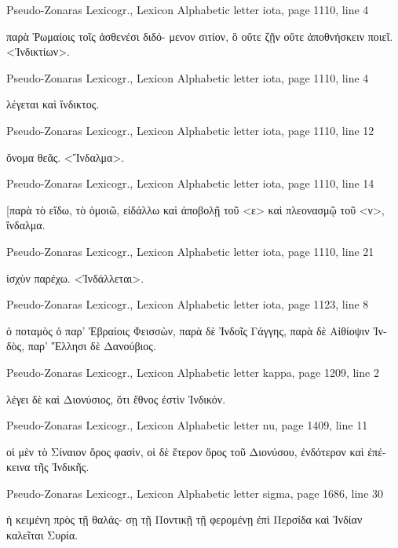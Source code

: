 \documentclass[12pt,letterpaper,twoside,final]{memoir}
\begin{document}
\begin{greek}
Pseudo-Zonaras Lexicogr., Lexicon 
Alphabetic letter iota, page 1110, line 4

                  παρὰ Ῥωμαίοις τοῖς ἀσθενέσι διδό-
 μενον σιτίον, ὃ οὔτε ζῇν οὔτε ἀποθνήσκειν ποιεῖ. 
<Ἰνδικτίων>. 



Pseudo-Zonaras Lexicogr., Lexicon 
Alphabetic letter iota, page 1110, line 4

                  λέγεται καὶ ἴνδικτος. 



Pseudo-Zonaras Lexicogr., Lexicon 
Alphabetic letter iota, page 1110, line 12

            ὄνομα θεᾶς. 
<Ἴνδαλμα>. 



Pseudo-Zonaras Lexicogr., Lexicon 
Alphabetic letter iota, page 1110, line 14

                                              [παρὰ 
 τὸ εἴδω, τὸ ὁμοιῶ, εἰδάλλω καὶ ἀποβολῇ τοῦ <ε> 
 καὶ πλεονασμῷ τοῦ <ν>, ἴνδαλμα. 



Pseudo-Zonaras Lexicogr., Lexicon 
Alphabetic letter iota, page 1110, line 21

               ἰσχὺν παρέχω. 
<Ἰνδάλλεται>. 



Pseudo-Zonaras Lexicogr., Lexicon 
Alphabetic letter iota, page 1123, line 8

               ὁ ποταμὸς ὁ παρ' Ἑβραίοις Φεισσὼν, 
 παρὰ δὲ Ἰνδοῖς Γάγγης, παρὰ δὲ Αἰθίοψιν Ἰν-
 δὸς, παρ' Ἕλλησι δὲ Δανούβιος. 



Pseudo-Zonaras Lexicogr., Lexicon 
Alphabetic letter kappa, page 1209, line 2

                                  λέγει δὲ καὶ Διονύσιος, 
 ὅτι ἔθνος ἐστὶν Ἰνδικόν. 



Pseudo-Zonaras Lexicogr., Lexicon 
Alphabetic letter nu, page 1409, line 11

                οἱ μὲν τὸ Σίναιον ὄρος φασὶν, οἱ δὲ 
 ἕτερον ὄρος τοῦ Διονύσου, ἐνδότερον καὶ ἐπέ-
 κεινα τῆς Ἰνδικῆς. 



Pseudo-Zonaras Lexicogr., Lexicon 
Alphabetic letter sigma, page 1686, line 30

                          ἡ κειμένη πρὸς τῇ θαλάς-
 σῃ τῇ Ποντικῇ τῇ φερομένῃ ἐπὶ Περσίδα καὶ 
 Ἰνδίαν καλεῖται Συρία. 




\end{greek}
\end{document}
